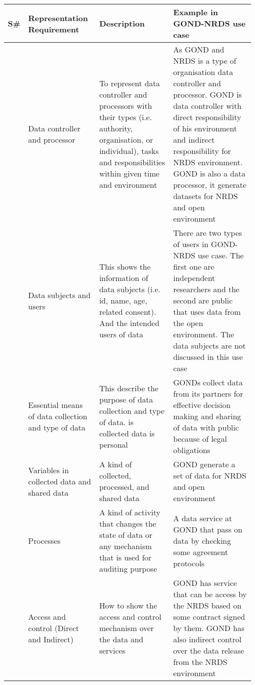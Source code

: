\begin{longtable}
\caption{Data Environment representation requirements for GOND-NRDS use case }\label{tab1}
\begin{tabularx}{\linewidth}{ 
  | >{\raggedright\arraybackslash}X 
  | >{\raggedright\arraybackslash}X 
    | >{\raggedright\arraybackslash}X 
  | >{\raggedright\arraybackslash}X | }
\hline
\textbf{S\#} &  \textbf{Representation Requirement}  &  \textbf{Description}  &  \textbf{Example in GOND-NRDS use case} \\
\hline
01 &  Data controller and processor  &  To represent data controller and processors with their types (i.e. authority, organisation, or individual), tasks and responsibilities within given time and environment &  As GOND  and NRDS is a type of organisation data controller and processor. GOND is data controller with direct responsibility of his environment and indirect responsibility for NRDS environment. GOND is also a data processor, it generate datasets for NRDS and open environment\\
\hline
01 &  Data subjects and users  &  This shows the information of data subjects (i.e. id, name, age, related consent). And the intended users of data  &  There are two types of users in GOND-NRDS use case. The first one are independent researchers and the second are public that uses data from the open environment. The data subjects are not discussed in this use case  \\
\hline
02 &  Essential means of data collection and type of data  &  This describe the purpose of data collection and type of data. is collected data is personal  &  GONDs collect data from its partners for effective decision making and sharing of data with public because of legal obligations   \\
\hline
03 &  Variables in collected data and shared data &  A kind of collected, processed, and shared data  &  GOND generate a set of data for NRDS and open environment \\
\hline
04 &  Processes  &  A kind of activity that changes the state of data  or any mechanism that is used for auditing purpose &  A data service at GOND that pass on data by checking some agreement protocols \\
\hline
05 &  Access and control (Direct and Indirect)  &  How to show the access and control mechanism over the data and services &  GOND has service that can be access by the NRDS  based on some contract signed by them. GOND has also indirect control over the data release from the NRDS environment  \\

\end{tabularx}
\end{longtable}
